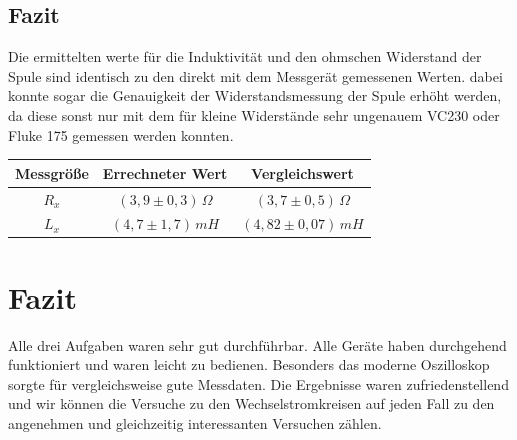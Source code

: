 \subsection{Fazit}
Die ermittelten werte für die Induktivität und den ohmschen Widerstand der Spule sind identisch zu den direkt mit dem Messgerät gemessenen Werten. dabei konnte sogar die Genauigkeit der Widerstandsmessung der Spule erhöht werden, da diese sonst nur mit dem für kleine Widerstände sehr ungenauem VC230 oder Fluke 175 gemessen werden konnten.
\begin{center}
\begin{tabular}{c|c|c}
Messgröße & Errechneter Wert & Vergleichswert\\\hline
\(R_x\) & \(\left(3,9 \pm 0,3 \right)\, \Omega \) &  \(\left(3,7 \pm 0,5 \right)\, \Omega \)\\
\(L_x\) & \((4,7\pm 1,7)\, mH \) & \((4,82\pm 0,07)\, mH\) \\
\end{tabular}
\end{center}

\section{Fazit}
Alle drei Aufgaben waren sehr gut durchführbar. Alle Geräte haben durchgehend funktioniert und waren leicht zu bedienen. Besonders das moderne Oszilloskop sorgte für vergleichsweise gute Messdaten. Die Ergebnisse waren zufriedenstellend und wir können die Versuche zu den Wechselstromkreisen auf jeden Fall zu den angenehmen und gleichzeitig interessanten Versuchen zählen.